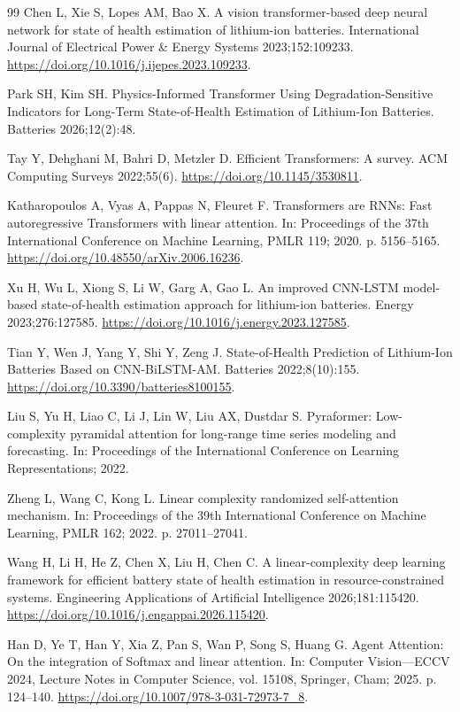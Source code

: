 \begin{thebibliography}{99}
 Chen L, Xie S, Lopes AM, Bao X. A vision transformer-based deep neural network for state of health estimation of lithium-ion batteries. International Journal of Electrical Power \& Energy Systems 2023;152:109233. \url{https://doi.org/10.1016/j.ijepes.2023.109233}.

 Park SH, Kim SH. Physics-Informed Transformer Using Degradation-Sensitive Indicators for Long-Term State-of-Health Estimation of Lithium-Ion Batteries. Batteries 2026;12(2):48.

 Tay Y, Dehghani M, Bahri D, Metzler D. Efficient Transformers: A survey. ACM Computing Surveys 2022;55(6). \url{https://doi.org/10.1145/3530811}.

 Katharopoulos A, Vyas A, Pappas N, Fleuret F. Transformers are RNNs: Fast autoregressive Transformers with linear attention. In: Proceedings of the 37th International Conference on Machine Learning, PMLR 119; 2020. p. 5156–5165. \url{https://doi.org/10.48550/arXiv.2006.16236}.

 Xu H, Wu L, Xiong S, Li W, Garg A, Gao L. An improved CNN-LSTM model-based state-of-health estimation approach for lithium-ion batteries. Energy 2023;276:127585. \url{https://doi.org/10.1016/j.energy.2023.127585}.

 Tian Y, Wen J, Yang Y, Shi Y, Zeng J. State-of-Health Prediction of Lithium-Ion Batteries Based on CNN-BiLSTM-AM. Batteries 2022;8(10):155. \url{https://doi.org/10.3390/batteries8100155}.

 Liu S, Yu H, Liao C, Li J, Lin W, Liu AX, Dustdar S. Pyraformer: Low-complexity pyramidal attention for long-range time series modeling and forecasting. In: Proceedings of the International Conference on Learning Representations; 2022.

 Zheng L, Wang C, Kong L. Linear complexity randomized self-attention mechanism. In: Proceedings of the 39th International Conference on Machine Learning, PMLR 162; 2022. p. 27011–27041.

 Wang H, Li H, He Z, Chen X, Liu H, Chen C. A linear-complexity deep learning framework for efficient battery state of health estimation in resource-constrained systems. Engineering Applications of Artificial Intelligence 2026;181:115420. \url{https://doi.org/10.1016/j.engappai.2026.115420}.

 Han D, Ye T, Han Y, Xia Z, Pan S, Wan P, Song S, Huang G. Agent Attention: On the integration of Softmax and linear attention. In: Computer Vision—ECCV 2024, Lecture Notes in Computer Science, vol. 15108, Springer, Cham; 2025. p. 124–140. \url{https://doi.org/10.1007/978-3-031-72973-7\_8}.


\end{thebibliography}

